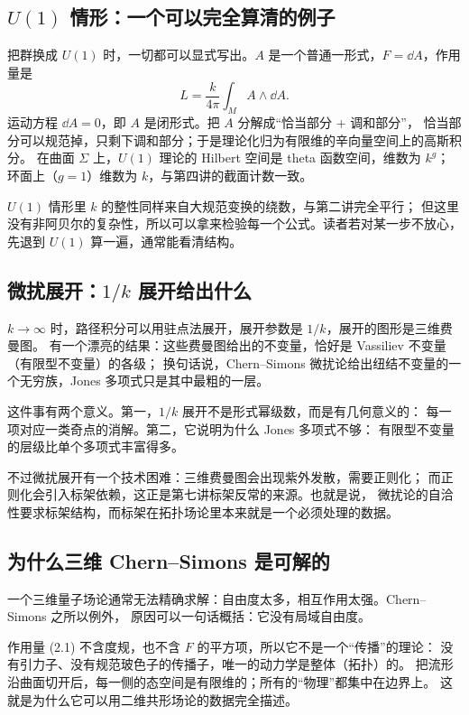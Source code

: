 \subsection{$U(1)$ 情形：一个可以完全算清的例子}

把群换成 $U(1)$ 时，一切都可以显式写出。$A$ 是一个普通一形式，$F=\dd A$，作用量是
\[
L=\frac{k}{4\pi}\int_M A\wedge\dd A .
\]
运动方程 $\dd A=0$，即 $A$ 是闭形式。把 $A$ 分解成“恰当部分 + 调和部分”，
恰当部分可以规范掉，只剩下调和部分；于是理论化归为有限维的辛向量空间上的高斯积分。
在曲面 $\Sigma$ 上，$U(1)$ 理论的 Hilbert 空间是 theta 函数空间，维数为 $k^g$；
环面上（$g=1$）维数为 $k$，与第四讲的截面计数一致。

$U(1)$ 情形里 $k$ 的整性同样来自大规范变换的绕数，与第二讲完全平行；
但这里没有非阿贝尔的复杂性，所以可以拿来检验每一个公式。读者若对某一步不放心，
先退到 $U(1)$ 算一遍，通常能看清结构。

\subsection{微扰展开：$1/k$ 展开给出什么}

$k\to\infty$ 时，路径积分可以用驻点法展开，展开参数是 $1/k$，展开的图形是三维费曼图。
有一个漂亮的结果：这些费曼图给出的不变量，恰好是 Vassiliev 不变量（有限型不变量）的各级；
换句话说，Chern--Simons 微扰论给出纽结不变量的一个无穷族，Jones 多项式只是其中最粗的一层。

这件事有两个意义。第一，$1/k$ 展开不是形式幂级数，而是有几何意义的：
每一项对应一类奇点的消解。第二，它说明为什么 Jones 多项式不够：
有限型不变量的层级比单个多项式丰富得多。

不过微扰展开有一个技术困难：三维费曼图会出现紫外发散，需要正则化；
而正则化会引入标架依赖，这正是第七讲标架反常的来源。也就是说，
微扰论的自洽性要求标架结构，而标架在拓扑场论里本来就是一个必须处理的数据。

\subsection{为什么三维 Chern--Simons 是可解的}

一个三维量子场论通常无法精确求解：自由度太多，相互作用太强。Chern--Simons 之所以例外，
原因可以一句话概括：它没有局域自由度。

作用量 (2.1) 不含度规，也不含 $F$ 的平方项，所以它不是一个“传播”的理论：
没有引力子、没有规范玻色子的传播子，唯一的动力学是整体（拓扑）的。
把流形沿曲面切开后，每一侧的态空间是有限维的；所有的“物理”都集中在边界上。
这就是为什么它可以用二维共形场论的数据完全描述。

